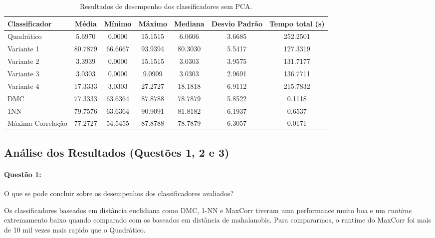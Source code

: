 \documentclass[a4paper, 12pt]{article}
\begin{document}
\begin{table}[H]
    \centering
    \caption{Resultados de desempenho dos classificadores sem PCA.}
    \label{tab:sem_pca}
    \begin{tabular}{lcccccc}
        \toprule
        \textbf{Classificador} & \textbf{Média} & \textbf{Mínimo} & \textbf{Máximo} & \textbf{Mediana} & \textbf{Desvio Padrão} & \textbf{Tempo total (s)} \\
        \midrule

        Quadrático         & 5.6970   & 0.0000   & 15.1515  & 6.0606   & 3.6685         & 252.2501\\
        Variante 1         & 80.7879  & 66.6667  & 93.9394  & 80.3030  & 5.5417         & 127.3319\\
        Variante 2         & 3.3939   & 0.0000   & 15.1515  & 3.0303   & 3.9575         & 131.7177\\
        Variante 3         & 3.0303   & 0.0000   & 9.0909   & 3.0303   & 2.9691         & 136.7711\\
        Variante 4         & 17.3333  & 3.0303   & 27.2727  & 18.1818  & 6.9112         & 215.7832\\
        DMC                & 77.3333  & 63.6364  & 87.8788  & 78.7879  & 5.8522         & 0.1118\\
        1NN                & 79.7576  & 63.6364  & 90.9091  & 81.8182  & 6.1937         & 0.6537\\
        Máxima Correlação  & 77.2727  & 54.5455  & 87.8788  & 78.7879  & 6.3057         & 0.0171\\
        \bottomrule
    \end{tabular}
\end{table}

\subsection*{Análise dos Resultados (Questões 1, 2 e 3)}
\paragraph{Questão 1:} O que se pode concluir sobre os desempenhos dos classificadores avaliados?

Os classificadores baseados em distância euclidiana como DMC, 1-NN e MaxCorr
tiveram uma performance muito boa e um \textit{runtime} extremamento baixo quando comparado com os baseados
em distância de mahalanobis.
Para compararmos, o runtime do MaxCorr foi mais de 10 mil vezes mais rapido que
o Quadrático.
\end{document}
